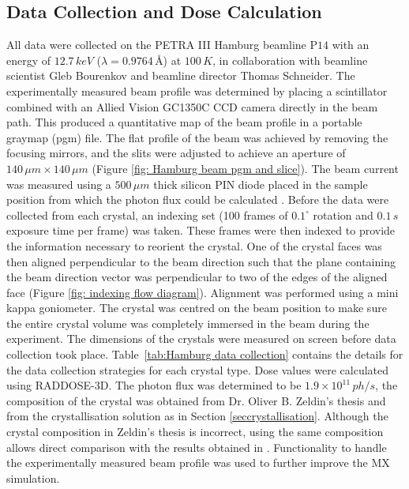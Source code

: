 \subsection{Data Collection and Dose Calculation}
\label{sub:Data Collection and Dose Calculation}
All data were collected on the PETRA III Hamburg beamline P$14$ with an energy of $12.7\,keV$ ($\lambda = 0.9764\,$\AA) at $100\,K$, in collaboration with beamline scientist Gleb Bourenkov and beamline director Thomas Schneider.
The experimentally measured beam profile was determined by placing a scintillator combined with an Allied Vision GC1350C CCD camera directly in the beam path.
This produced a quantitative map of the beam profile in a portable graymap (pgm) file.
The flat profile of the beam was achieved by removing the focusing mirrors, and the slits were adjusted to achieve an aperture of $140\,\mu m \times 140\,\mu m$ (Figure \ref{fig: Hamburg beam pgm and slice}).
The beam current was measured using a $500\,\mu m$ thick silicon PIN diode placed in the sample position from which the photon flux could be calculated \cite{owen2009}.
Before the data were collected from each crystal, an indexing set (100 frames of $0.1^\circ$ rotation and $0.1\,s$ exposure time per frame) was taken.
These frames were then indexed to provide the information necessary to reorient the crystal.
One of the crystal faces was then aligned perpendicular to the beam direction such that the plane containing the beam direction vector was perpendicular to two of the edges of the aligned face (Figure \ref{fig: indexing flow diagram}).
Alignment was performed using a mini kappa goniometer.
The crystal was centred on the beam position to make sure the entire crystal volume was completely immersed in the beam during the experiment.
The dimensions of the crystals were measured on screen before data collection took place.
Table~\ref{tab:Hamburg data collection} contains the details for the data collection strategies for each crystal type.
Dose values were calculated using RADDOSE-3D.
The photon flux was determined to be $1.9 \times 10^{11}\,ph/s$, the composition of the crystal was obtained from Dr. Oliver B. Zeldin's thesis \cite{zeldin2013thesis} and from the crystallisation solution as in Section \ref{seccrystallisation}.
Although the crystal composition in Zeldin's thesis is incorrect, using the same composition allows direct comparison with the results obtained in \cite{zeldin2013dwd}.
Functionality to handle the experimentally measured beam profile was used to further improve the MX simulation.
